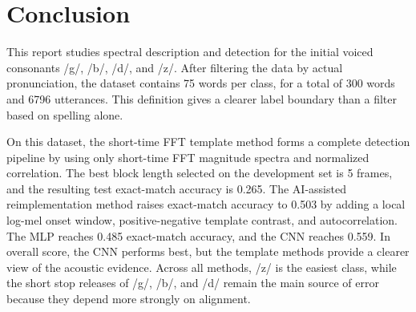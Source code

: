 \section{Conclusion}

This report studies spectral description and detection for the initial voiced consonants /g/, /b/, /d/, and /z/. After filtering the data by actual pronunciation, the dataset contains 75 words per class, for a total of 300 words and 6796 utterances. This definition gives a clearer label boundary than a filter based on spelling alone.

On this dataset, the short-time FFT template method forms a complete detection pipeline by using only short-time FFT magnitude spectra and normalized correlation. The best block length selected on the development set is 5 frames, and the resulting test exact-match accuracy is 0.265. The AI-assisted reimplementation method raises exact-match accuracy to 0.503 by adding a local log-mel onset window, positive-negative template contrast, and autocorrelation. The MLP reaches 0.485 exact-match accuracy, and the CNN reaches 0.559. In overall score, the CNN performs best, but the template methods provide a clearer view of the acoustic evidence. Across all methods, /z/ is the easiest class, while the short stop releases of /g/, /b/, and /d/ remain the main source of error because they depend more strongly on alignment.
